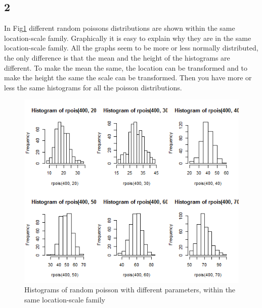 \documentclass{article}
\begin{document}
    \subsection*{2}
      In Fig\ref{fig:Hist3_2} different random poissons distributions are shown within the same location-scale family.
      Graphically it is easy to explain why they are in the same location-scale family.
      All the graphs seem to be more or less normally distributed,
      the only difference is that the mean and the height of the histograms are different.
      To make the mean the same, the location can be transformed and to make the height the same the scale can be transformed.
      Then you have more or less the same histograms for all the poisson distributions.
      \begin{figure}[H]
          \centering
          \includegraphics[scale=0.3]{../results/3_2.png}
          \caption{Histograms of random poisson with different parameters, within the same location-scale family}
          \label{fig:Hist3_2}
      \end{figure}
\end{document}
